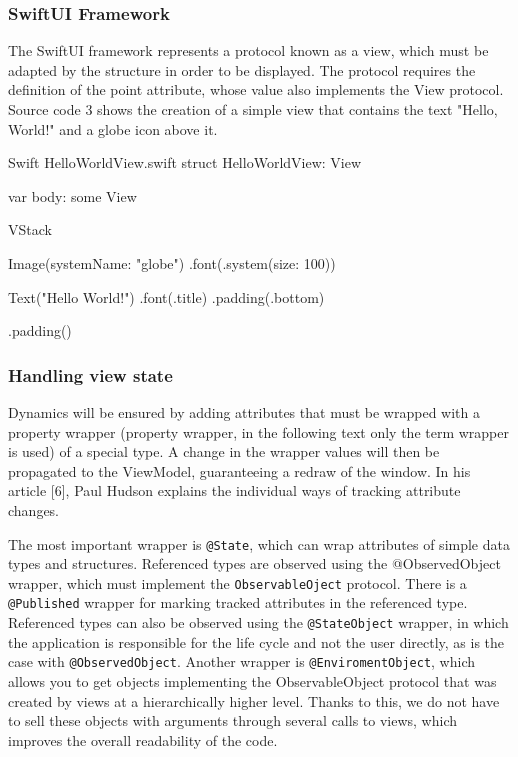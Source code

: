 \documentclass[
  biblatex,
  language=english,
  figures=false,
  sourcecodes,
  glossaries,
  index
]{kidiplom}
\begin{document}
\subsubsection{SwiftUI Framework}
The SwiftUI framework represents a protocol known as a view, which must be adapted by the structure in order to be displayed. The protocol requires the definition of the point attribute, whose value also implements the View protocol. Source code 3 shows the creation of a simple view that contains the text "Hello, World!" and a globe icon above it.

\begin{kicode}{Swift}{} {HelloWorldView.swift}
struct HelloWorldView: View {
    var body: some View {
        VStack {
            Image(systemName: "globe")
                .font(.system(size: 100))
                
            Text("Hello World!")
                .font(.title)
                .padding(.bottom)
        }
        .padding()
    }
}
\end{kicode}

\subsubsection{Handling view state}
Dynamics will be ensured by adding attributes that must be wrapped with a property wrapper (property wrapper, in the following text only the term wrapper is used) of a special type. A change in the wrapper values will then be propagated to the ViewModel, guaranteeing a redraw of the window. In his article [6], Paul Hudson explains the individual ways of tracking attribute changes.

The most important wrapper is \texttt{@State}, which can wrap attributes of simple data types and structures. Referenced types are observed using the @ObservedObject wrapper, which must implement the \texttt{ObservableOject} protocol. There is a \texttt{@Published} wrapper for marking tracked attributes in the referenced type. Referenced types can also be observed using the \texttt{@StateObject} wrapper, in which the application is responsible for the life cycle and not the user directly, as is the case with \texttt{@ObservedObject}. Another wrapper is \texttt{@EnviromentObject}, which allows you to get objects implementing the ObservableObject protocol that was created by views at a hierarchically higher level. Thanks to this, we do not have to sell these objects with arguments through several calls to views, which improves the overall readability of the code.
\end{document}
